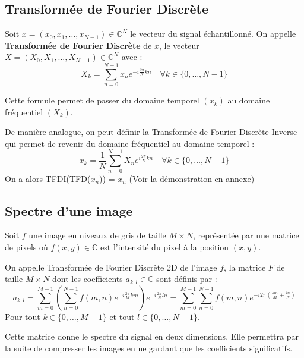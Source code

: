 \subsection{Transformée de Fourier Discrète}
\label{section-TFD}

Soit $x = (x_0, x_1, \dots, x_{N-1}) \in \mathbb{C}^N$ le vecteur du signal échantillonné. On appelle \textbf{Transformée de Fourier Discrète} \cite{wiki-tfd} de $x$, le vecteur $X = (X_0, X_1,..., X_{N-1}) \in \mathbb{C}^N$ avec :
$$
X_k = \sum_{n=0}^{N-1} x_n e^{-i \frac{2\pi}{N} kn} \quad \forall k \in \{0, \dots, N-1\}
$$

Cette formule permet de passer du domaine temporel $(x_k)$ au domaine fréquentiel $(X_k)$.

De manière analogue, on peut définir la {Transformée de Fourier Discrète Inverse} qui permet de revenir du domaine fréquentiel au domaine temporel :
$$x_k = \dfrac{1}{N}\sum_{n=0}^{N-1}X_ne^{i \frac{2 \pi}{N}kn}\quad \forall k \in \{0, \dots, N-1\}
$$
On a alors TFDI(TFD($x_n$)) = $x_n$ (\hyperref[preuve-TFDI]{Voir la démonstration en annexe})

\subsection{Spectre d'une image}
Soit $f$ une image en niveaux de gris de taille $M \times N$, représentée par une matrice de pixels où $f(x, y) \in \mathbb{C}$ est l'intensité du pixel à la position $(x, y)$.

On appelle Transformée de Fourier Discrète 2D de l'image $f$, la matrice $F$ de taille $M \times N$ dont les coefficients $a_{k, l} \in \mathbb{C}$ sont définis par :
$$a_{k, l} = \sum_{m=0}^{M-1} \left( \sum_{n=0}^{N-1} f(m, n) e^{-i \frac{2\pi}{M} km} \right) e^{-i \frac{2\pi}{N} ln}
= \sum_{m=0}^{M-1} \sum_{n=0}^{N-1} f(m, n) e^{-i 2\pi \left( \frac{km}{M} + \frac{ln}{N} \right)}$$
Pour tout $k \in \{0, \dots, M-1\}$ et tout $l \in \{0, \dots, N-1\}$.

Cette matrice donne le spectre du signal en deux dimensions. Elle permettra par la suite de compresser les images en ne gardant que les coefficients significatifs.
